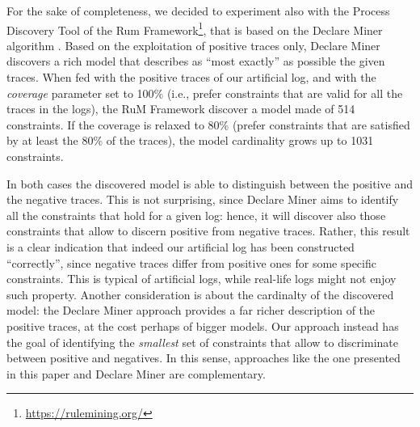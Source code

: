 For the sake of completeness, we decided to experiment also with the Process Discovery Tool of the Rum Framework\footnote{\url{https://rulemining.org/}}, that is based on the Declare Miner algorithm \cite{2018a-Maggi}. Based on the exploitation of positive traces only, Declare Miner discovers a rich model that describes as ``most exactly'' as possible the given traces. When fed with the positive traces of our artificial log, and with the \emph{coverage} parameter set to 100\% (i.e., prefer constraints that are valid for all the traces in the logs), the RuM Framework discover a model made of 514 constraints. If the coverage is relaxed to 80\% (prefer constraints that are satisfied by at least the 80\% of the traces), the model cardinality grows up to 1031 constraints.

In both cases the discovered model is able to distinguish between the positive and the negative traces. This is not surprising, since Declare Miner aims to identify all the constraints that hold for a given log: hence, it will discover also those constraints that allow to discern positive from negative traces. Rather, this result is a clear indication that indeed our artificial log has been constructed ``correctly'', since negative traces differ from positive ones for some specific constraints. This is typical of artificial logs, while real-life logs might not enjoy such property.
%
Another consideration is about the cardinalty of the discovered model: the Declare Miner approach provides a far richer description of the positive traces, at the cost perhaps of bigger models. Our approach instead has the goal of identifying the \emph{smallest} set of constraints that allow to discriminate between positive and negatives. In this sense, approaches like the one presented in this paper and Declare Miner are complementary.









